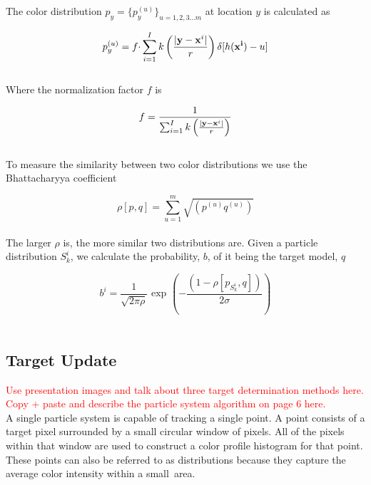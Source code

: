 \documentclass[12pt]{article}
\begin{document}
The color distribution $p_y = \{p_y^{(u)}\}_{u = 1,2,3 \dots m}$ at location $y$ is calculated as

\begin{equation}
p_y^{(u)} = f \cdotp \sum^I_{i=1} k \left ( \frac{| {\bf y} - {\bf x}^i|}{r} \right ) \delta [h({\bf x^i})-u]
\label{eq:cdist}
\end{equation} \\

Where the normalization factor $f$ is

\begin{equation}
f = \frac{1}{\sum^I_{i=1} k \left ( \frac{| {\bf y} - {\bf x}^i|}{r} \right )}
\label{eq:normfact}
\end{equation} \\

To measure the similarity between two color distributions we use the Bhattacharyya coefficient

\begin{equation}
\rho[p,q] = \sum^m_{u=1} \sqrt{ (p^{(u)} q^{(u)}) } 
\label{eq:bcoeff}
\end{equation} \\

The larger $\rho$ is, the more similar two distributions are. Given a particle distribution $S_k^i$, we calculate the probability, $b$, of it being the target model, $q$

\begin{equation}
b^i = \frac{1}{\sqrt{2\pi\rho}} \text{ exp } \left ( - \frac{(1-\rho[p_{S_k^i},q])}{2\sigma} \right )
\label{eq:bprob}
\end{equation} \\


\subsection{Target Update}

\textcolor{red}{Use presentation images and talk about three target determination methods here.} \\



\textcolor{red}{Copy + paste and describe the particle system algorithm on page 6 here.} \\


A single particle system is capable of tracking a single point. A point consists of a target pixel surrounded by a small circular window of pixels. All of the pixels within that window are used to construct a color profile histogram for that point. These points can also be referred to as distributions because they capture the average color intensity within a small~area.
\end{document}
